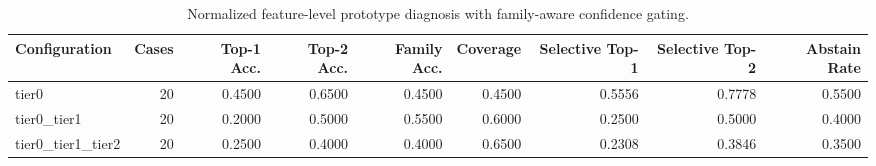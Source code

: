 \begin{table}[t]
\centering
\caption{Normalized feature-level prototype diagnosis with family-aware confidence gating.}
\label{tab:dice_stressor_hierarchical_diagnosis}
\footnotesize
\begin{tabular}{lrrrrrrrr}
\toprule
Configuration & Cases & Top-1 Acc. & Top-2 Acc. & Family Acc. & Coverage & Selective Top-1 & Selective Top-2 & Abstain Rate \\
\midrule
tier0 & 20 & 0.4500 & 0.6500 & 0.4500 & 0.4500 & 0.5556 & 0.7778 & 0.5500 \\
tier0_tier1 & 20 & 0.2000 & 0.5000 & 0.5500 & 0.6000 & 0.2500 & 0.5000 & 0.4000 \\
tier0_tier1_tier2 & 20 & 0.2500 & 0.4000 & 0.4000 & 0.6500 & 0.2308 & 0.3846 & 0.3500 \\
\bottomrule
\end{tabular}

\end{table}
